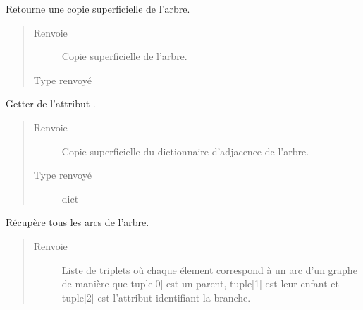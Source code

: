 \documentclass[letterpaper,10pt,french]{sphinxmanual}
\begin{document}
\begin{fulllineitems}
\begin{fulllineitems}
\label{\detokenize{index:StrategyTree.StrategyTree.copy}}
Retourne une copie superficielle de l’arbre.
\begin{quote}\begin{description}
\item[{Renvoie}] \leavevmode
{} \textendash{} Copie superficielle de l’arbre.

\item[{Type renvoyé}] \leavevmode
{\hyperref[\detokenize{index:StrategyTree.StrategyTree}]{}}

\end{description}\end{quote}

\end{fulllineitems}


\begin{fulllineitems}
\label{\detokenize{index:StrategyTree.StrategyTree.get_adj_dict}}
Getter de l’attribut .
\begin{quote}\begin{description}
\item[{Renvoie}] \leavevmode
{} \textendash{} Copie superficielle du dictionnaire d’adjacence de l’arbre.

\item[{Type renvoyé}] \leavevmode
dict

\end{description}\end{quote}

\end{fulllineitems}


\begin{fulllineitems}
\label{\detokenize{index:StrategyTree.StrategyTree.get_edges}}
Récupère tous les arcs de l’arbre.
\begin{quote}\begin{description}
\item[{Renvoie}] \leavevmode
{} \textendash{} Liste de triplets où chaque élement correspond à un arc d’un graphe
de manière que tuple{[}0{]} est un parent, tuple{[}1{]} est leur enfant et
tuple{[}2{]} est l’attribut identifiant la branche.


\end{description}
\end{quote}
\end{fulllineitems}
\end{fulllineitems}
\end{document}
